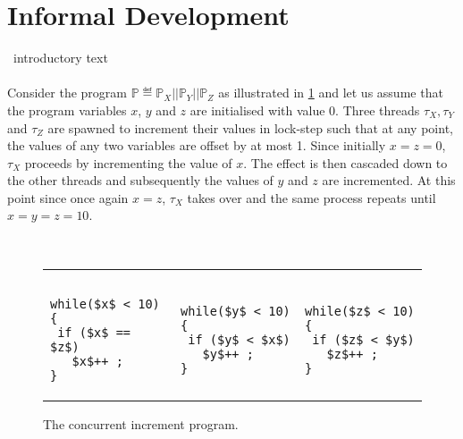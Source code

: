 \section{Informal Development}
\label{sec:intuition}
\todo\ introductory text\\\\
Consider the program $\mathbb{P} \eqdef \mathbb{P}_X || \mathbb{P}_Y || \mathbb{P}_Z$ as illustrated in \fig\ref{fig:concurrentInc} and let us assume that the program variables $x$, $y$ and $z$ are initialised with value $0$. Three threads $\tau_X, \tau_Y$ and $\tau_Z$ are spawned to increment their values in lock-step such that at any point, the values of any two variables are offset by at most 1. Since initially $x=z=0$, $\tau_X$ proceeds by incrementing the value of $x$. The effect is then cascaded down to the other threads and subsequently the values of $y$ and $z$ are incremented. At this point since once again $x = z$, $\tau_X$ takes over and the same process repeats until $x = y = z = 10$. 
%
%
\begin{figure}
\noindent\makebox[\linewidth]{\rule{\linewidth}{1pt}} \vspace*{-5pt}\\
\begin{tabular}{@{}l@{\ }||@{\ }l@{\ }||@{\ }l@{}}
	\color{blue}{$\mathbb{P}_X$ :}& 
	\color{blue}{$\mathbb{P}_Y$ :}& 
	\color{blue}{$\mathbb{P}_Z$ :} \\
	 &&\vspace*{-5pt}\\
\begin{lstlisting}[mathescape]
while($x$ < 10){
 if ($x$ == $z$) 
   $x$++ ;
}
\end{lstlisting}
&
\begin{lstlisting}[mathescape]
while($y$ < 10){
 if ($y$ < $x$) 
   $y$++ ;
}
\end{lstlisting}
&
\begin{lstlisting}[mathescape]
while($z$ < 10){
 if ($z$ < $y$) 
   $z$++ ;
}
\end{lstlisting}
\end{tabular}

\vspace*{5pt}\noindent\makebox[\linewidth]{\rule{\linewidth}{1pt}} \vspace*{-12pt}
\caption{The concurrent increment program.}
\label{fig:concurrentInc}
\end{figure}
%
%
%
%
